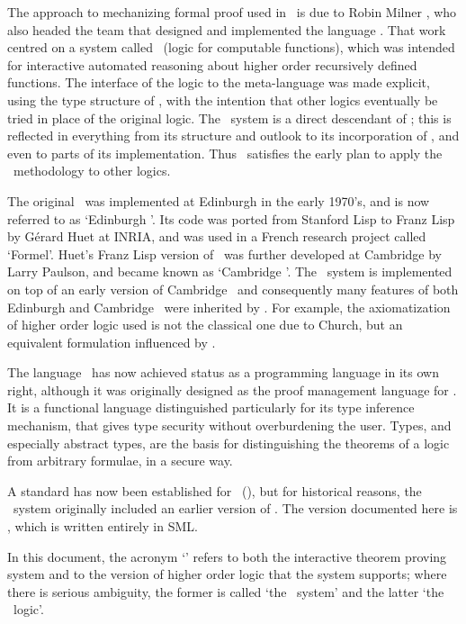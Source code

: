 The approach to mechanizing formal proof used in \HOL\ is due to Robin Milner
\cite{Edinburgh-LCF}, who also headed the team that designed and implemented
the language \ML.  That work centred on a system called \LCF\ (logic for
computable functions), which was intended for interactive automated reasoning
about higher order recursively defined functions.  The interface of the logic
to the meta-language was made explicit, using the type structure of \ML, with
the intention that other logics eventually be tried in place of the original
logic.  The \HOL\ system is a direct descendant of \LCF; this is reflected in
everything from its structure and outlook to its incorporation of \ML, and even
to parts of its implementation.  Thus \HOL\ satisfies the early plan to apply
the \LCF\ methodology to other logics.

The original \LCF\ was implemented at Edinburgh in the early 1970's, and is now
referred to as `Edinburgh \LCF'. Its code was ported from Stanford Lisp to
Franz Lisp by G\'erard Huet at {\small INRIA}, and was used in a French
research project called `Formel'.  Huet's Franz Lisp version of \LCF\ was
further developed at Cambridge by Larry Paulson, and became known as `Cambridge
\LCF'. The \HOL\ system is implemented on top of an early version of Cambridge
\LCF\ and consequently many features of both Edinburgh and Cambridge \LCF\ were
inherited by \HOL. For example, the axiomatization of higher order logic used
is not the classical one due to Church, but an equivalent formulation
influenced by \LCF.

The language \ML\ has now achieved status as a programming language in its own
right, although it was originally designed as the proof management language for
\LCF.  It is a functional language distinguished particularly for its type
inference mechanism, that gives type security without overburdening the user.
Types, and especially abstract types, are the basis for distinguishing the
theorems of a logic from arbitrary formulae, in a secure way.

A standard has now been established for \ML\ (\cite{sml}), but for
historical reasons, the \HOL\ system originally included an earlier
version of \ML.  The version documented here is , which is
written entirely in SML.

In this document, the acronym `\HOL' refers to both the interactive theorem
proving system and to the version of higher order logic that the system
supports; where there is serious ambiguity, the former is called `the \HOL\
system' and the latter `the \HOL\ logic'.

